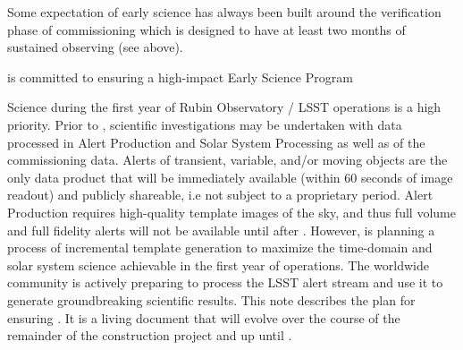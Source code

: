 Some expectation of early science has always been built around the verification phase of commissioning which is designed to have at least two months of sustained observing (see above). 

\ro is committed to ensuring a high-impact Early Science Program



Science during the first year of Rubin Observatory / LSST operations is a high priority. 
Prior to \drone, scientific investigations may be undertaken with data processed in Alert Production and Solar System Processing as well as \dpvs of the commissioning data.
Alerts of transient, variable, and/or moving objects are the only data product that will be immediately available (within 60 seconds of image readout) and publicly shareable, i.e not subject to a proprietary period. 
Alert Production requires high-quality template images of the sky, and thus full volume and full fidelity alerts will not be available until after \drone.
However, \ro is planning a process of incremental template generation to maximize the time-domain and solar system science achievable in the first year of operations.
The worldwide community is actively preparing to process the LSST alert stream and use it to generate groundbreaking scientific results. 
This note describes the \ro plan for ensuring \es. 
It is a living document that will evolve over the course of the remainder of the construction project and up until \drone. 
